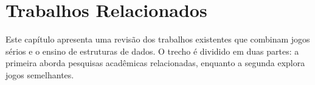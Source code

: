 \chapter{Trabalhos Relacionados}

Este capítulo apresenta uma revisão dos trabalhos existentes que combinam jogos sérios e o ensino de estruturas de dados. O trecho é dividido em duas partes: a primeira aborda pesquisas acadêmicas relacionadas, enquanto a segunda explora jogos semelhantes.





